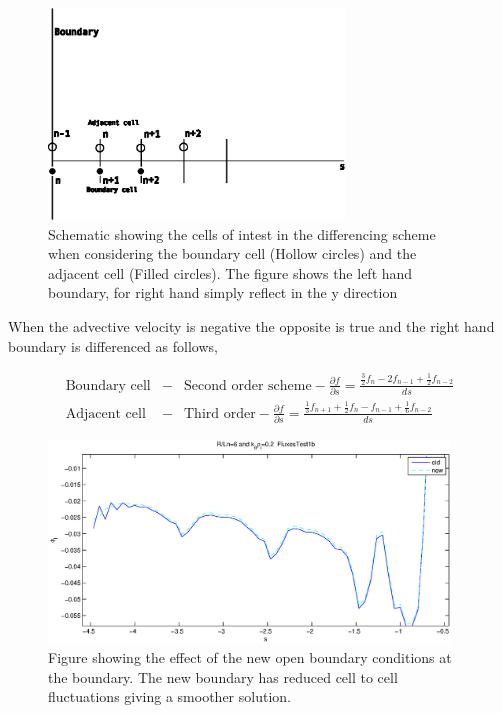 \documentclass{report}
\begin{document}
\begin{figure}
\begin{center}
\includegraphics[width=0.7\textwidth]{Boundarydiff.eps}
\caption{Schematic showing the cells of intest in the differencing scheme when considering the boundary cell (Hollow circles) and the adjacent cell (Filled circles).  The figure shows the left hand boundary, for right hand simply reflect in the y direction}
\label{boundarydiffs}
\end{center}
\end{figure}

When the advective velocity is negative the opposite is true and the right hand boundary is differenced as follows,

\begin{eqnarray}
\mbox{Boundary cell} &-& \mbox{Second order scheme} - \frac{\partial f}{\partial s} = \frac{\frac{3}{2}f_{n} - 2f_{n-1} +\frac{1}{2}f_{n-2}}{ds}\nonumber\\
\mbox{Adjacent cell} &-& \mbox{Third order} - \frac{\partial f}{\partial s} = \frac{\frac{1}{3}f_{n+1} +\frac{1}{2}f_{n} - f_{n-1} + \frac{1}{6}f_{n-2}}{ds}\nonumber
\end{eqnarray}

\begin{figure}
\begin{center}
\includegraphics[width=0.95\textwidth]{fluxcomp.eps}
\caption{Figure showing the effect of the new open boundary conditions at the boundary. The new boundary has reduced cell to cell fluctuations giving a smoother solution.}
\label{fluxcomp}
\end{center}
\end{figure}
\end{document}
